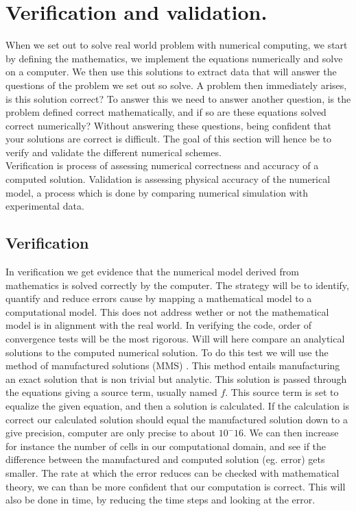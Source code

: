 \chapter{Verification and validation. }
When we set out to solve real world problem with numerical computing, we start by defining the mathematics, we implement the equations numerically and solve on a computer. We then use this solutions to extract data that will answer the questions of the problem we set out so solve. A problem then immediately arises, is this solution correct? To answer this we need to answer another question, is the problem defined correct mathematically, and if so are these equations solved correct numerically? Without answering these questions, being confident that your solutions are correct is difficult. \cite{Selin2014} The goal of this section will hence be to verify and validate the different numerical schemes. \\
Verification is process of assessing numerical correctness and accuracy of a computed solution. Validation is assessing physical accuracy of the numerical model, a process which is done by comparing numerical simulation with experimental data. 


\section{Verification}
In verification we get evidence that the numerical model derived from mathematics is solved correctly by the computer. The strategy will be to identify, quantify and reduce errors cause by mapping a mathematical model to a computational model. This does not address wether or not the mathematical model is in alignment with the real world. In verifying the code, order of convergence tests will be the most rigorous. Will will here compare an analytical solutions to the computed numerical solution. To do this test we will use the method of manufactured solutions (MMS) \cite{Roache2002}. This method entails manufacturing an exact solution that is non trivial but analytic. This solution is passed through the equations giving a source term, usually named $f$. This source term is set to equalize the given equation, and then a solution is calculated. If the calculation is correct our calculated solution should equal the manufactured solution down to a give precision, computer are only precise to about $10^-16$. We can then increase for instance the number of cells in our computational domain, and see if the difference between the manufactured and computed solution (eg. error) gets smaller. The rate at which the error reduces can be checked with mathematical theory, we can than be more confident that our computation is correct. This will also be done in time, by reducing the time steps and looking at the error.




